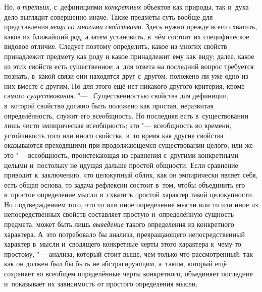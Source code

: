 Но, {\em в-третьих,}
с~дефинициями
{\em конкретных} объектов
как природы, так и~духа дело выглядит совершенно иначе. Такие предметы суть
вообще для представления {\em вещи}
{\em со многими свойствами}.
Здесь нужно прежде всего схватить, каков их ближайший род, а
затем установить, в~чём состоит их специфическое видовое отличие. Следует
поэтому определить, какое из многих свойств принадлежит предмету как роду и
какое принадлежит ему как виду; далее, какое из этих свойств есть
существенное; а~для ответа на последний вопрос требуется познать, в~какой
связи они находятся друг с~другом, положено ли уже одно из них вместе с
другим. Но для этого ещё нет никакого другого критерия, кроме самого
{\em существования}. "---
~Существенностью свойства для дефиниции, в~которой свойство
должно быть положено как простая, неразвитая определённость, служит его
всеобщность. Но последняя есть в~существовании лишь чисто эмпирическая
всеобщность; это "--- всеобщность во времени, устойчивость того
или иного свойства, в~то время как другие свойства оказываются преходящими
при продолжающемся существовании целого; или же это
"--- всеобщность, проистекающая из сравнения с~другими
конкретными целыми и~постольку не идущая дальше простой общности. Если
сравнение приводит к~заключению, что целокупный облик, как
он эмпирически являет себя, есть общая основа, то задача рефлексии состоит
в~том, чтобы объединить его в~простое определение мысли и~схватить простой
характер такой целокупности. Но подтверждением того, что то или иное
определение мысли или то или иное из непосредственных свойств составляет
простую и~определённую сущность предмета, может быть лишь
{\em выведение} такого
определения из конкретного характера. А~это потребовало бы анализа,
превращающего непосредственный характер в~мысли и~сводящего конкретные
черты этого характера к~чему-то простому, "--- анализа, который
стоит выше, чем только что рассмотренный, так как он должен был бы быть не
абстрагирующим, а~таким, который ещё сохраняет во всеобщем определённые
черты конкретного, объединяет последние и~показывает их зависимость от
простого определения мысли.

